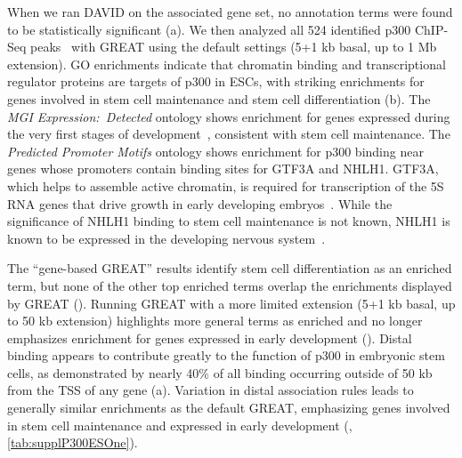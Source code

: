 When we ran DAVID on the associated gene set, no annotation terms were found
to be statistically significant (a).  We
then analyzed all 524 identified p300 ChIP-Seq peaks~\citep{Chen2008} with
GREAT using the default settings (5+1 kb basal, up to 1 Mb extension).  GO enrichments
indicate that chromatin binding and transcriptional regulator proteins are
targets of p300 in ESCs, with striking enrichments for genes involved in stem
cell maintenance and stem cell differentiation
(b).  The
\emph{MGI Expression:\ Detected} ontology shows enrichment for genes expressed
during the very first stages of development~\citep{Theiler1989}, consistent
with stem cell maintenance.  The \emph{Predicted Promoter Motifs} ontology
shows enrichment for p300 binding near genes whose promoters contain binding
sites for GTF3A and NHLH1.  GTF3A, which helps to assemble active chromatin,
is required for transcription of the 5S RNA genes that drive growth in early
developing embryos~\citep{Drew1995}.  While the significance of NHLH1 binding
to stem cell maintenance is not known, NHLH1 is known to be expressed in the
developing nervous system~\citep{Begley1992}.
%

The ``gene-based GREAT'' results identify stem cell differentiation as an enriched
term, but none of the other top enriched terms overlap the enrichments displayed
by GREAT ().
%
Running GREAT with a more limited extension (5+1 kb basal, up to 50 kb extension)
highlights more general terms as enriched and no longer emphasizes enrichment 
for genes expressed in early development ().
%
Distal binding appears to contribute greatly to the function of p300 in embryonic
stem cells, as demonstrated by nearly 40\% of all binding occurring outside of
50 kb from the TSS of any gene (a).
%
Variation in distal association rules leads to generally similar enrichments as the
default GREAT, emphasizing genes involved in stem cell maintenance and expressed in
early development (, \ref{tab:supplP300ESOne}).
%
%
% 

